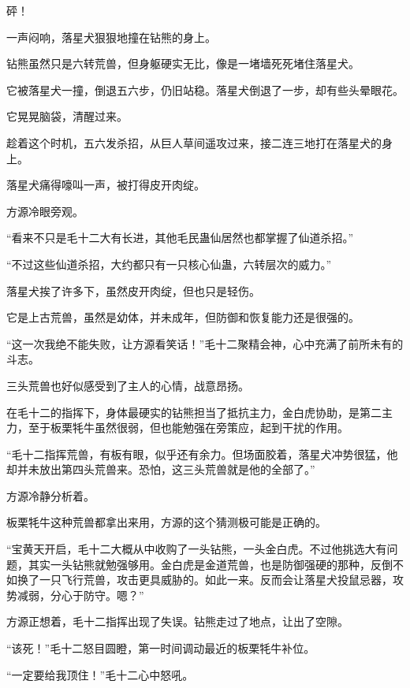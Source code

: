 
\begin{this_body}



砰！

一声闷响，落星犬狠狠地撞在钻熊的身上。

钻熊虽然只是六转荒兽，但身躯硬实无比，像是一堵墙死死堵住落星犬。

它被落星犬一撞，倒退五六步，仍旧站稳。落星犬倒退了一步，却有些头晕眼花。

它晃晃脑袋，清醒过来。

趁着这个时机，五六发杀招，从巨人草间遥攻过来，接二连三地打在落星犬的身上。

落星犬痛得嚎叫一声，被打得皮开肉绽。

方源冷眼旁观。

“看来不只是毛十二大有长进，其他毛民蛊仙居然也都掌握了仙道杀招。”

“不过这些仙道杀招，大约都只有一只核心仙蛊，六转层次的威力。”

落星犬挨了许多下，虽然皮开肉绽，但也只是轻伤。

它是上古荒兽，虽然是幼体，并未成年，但防御和恢复能力还是很强的。

“这一次我绝不能失败，让方源看笑话！”毛十二聚精会神，心中充满了前所未有的斗志。

三头荒兽也好似感受到了主人的心情，战意昂扬。

在毛十二的指挥下，身体最硬实的钻熊担当了抵抗主力，金白虎协助，是第二主力，至于板栗牦牛虽然很弱，但也能勉强在旁策应，起到干扰的作用。

“毛十二指挥荒兽，有板有眼，似乎还有余力。但场面胶着，落星犬冲势很猛，他却并未放出第四头荒兽来。恐怕，这三头荒兽就是他的全部了。”

方源冷静分析着。

板栗牦牛这种荒兽都拿出来用，方源的这个猜测极可能是正确的。

“宝黄天开启，毛十二大概从中收购了一头钻熊，一头金白虎。不过他挑选大有问题，其实一头钻熊就勉强够用。金白虎是金道荒兽，也是防御强硬的那种，反倒不如换了一只飞行荒兽，攻击更具威胁的。如此一来。反而会让落星犬投鼠忌器，攻势减弱，分心于防守。嗯？”

方源正想着，毛十二指挥出现了失误。钻熊走过了地点，让出了空隙。

“该死！”毛十二怒目圆瞪，第一时间调动最近的板栗牦牛补位。

“一定要给我顶住！”毛十二心中怒吼。


\end{this_body}
